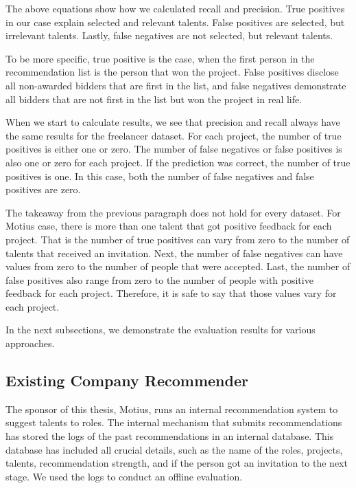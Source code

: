 The above equations show how we calculated recall and precision. True positives in our case explain selected and relevant talents. False positives are selected, but irrelevant talents. Lastly, false negatives are not selected, but relevant talents.

To be more specific, true positive is the case, when the first person in the recommendation list is the person that won the project. False positives disclose all non-awarded bidders that are first in the list, and false negatives demonstrate all bidders that are not first in the list but won the project in real life. 

When we start to calculate results, we see that precision and recall always have the same results for the freelancer dataset. For each project, the number of true positives is either one or zero. The number of false negatives or false positives is also one or zero for each project. If the prediction was correct, the number of true positives is one. In this case, both the number of false negatives and false positives are zero.

The takeaway from the previous paragraph does not hold for every dataset. For Motius case, there is more than one talent that got positive feedback for each project. That is the number of true positives can vary from zero to the number of talents that received an invitation. Next, the number of false negatives can have values from zero to the number of people that were accepted. Last, the number of false positives also range from zero to the number of people with positive feedback for each project. Therefore, it is safe to say that those values vary for each project.

In the next subsections, we demonstrate the evaluation results for various approaches.


\subsection{Existing Company Recommender}

The sponsor of this thesis, Motius, runs an internal recommendation system to suggest talents to roles. The internal mechanism that submits recommendations has stored the logs of the past recommendations in an internal database. This database has included all crucial details, such as the name of the roles, projects, talents, recommendation strength, and if the person got an invitation to the next stage. We used the logs to conduct an offline evaluation.

